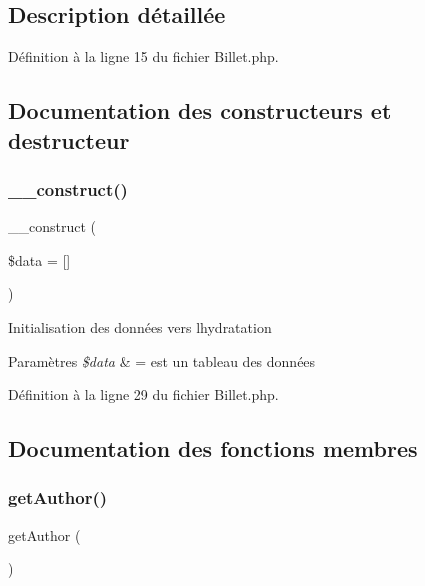 \subsection{Description détaillée}


Définition à la ligne 15 du fichier Billet.\+php.



\subsection{Documentation des constructeurs et destructeur}
\mbox{\label{class_src_1_1_entity_1_1_billet_ab3129f1d71e9f51353de9d551ea381d7}} 
\subsubsection{\texorpdfstring{\+\_\+\+\_\+construct()}{\_\_construct()}}
{\footnotesize\ttfamily \+\_\+\+\_\+construct (\begin{DoxyParamCaption}\item[{}]{\$data = {\ttfamily \mbox{[}\mbox{]}} }\end{DoxyParamCaption})}

Initialisation des données vers l\textquotesingle{}hydratation 
\begin{DoxyParams}{Paramètres}
{\em \$data} & = est un tableau des données \\
\hline
\end{DoxyParams}


Définition à la ligne 29 du fichier Billet.\+php.



\subsection{Documentation des fonctions membres}
\mbox{\label{class_src_1_1_entity_1_1_billet_a5286e30390ae3e1b274940286493dd24}} 
\subsubsection{\texorpdfstring{get\+Author()}{getAuthor()}}
{\footnotesize\ttfamily get\+Author (\begin{DoxyParamCaption}{ }\end{DoxyParamCaption})}



